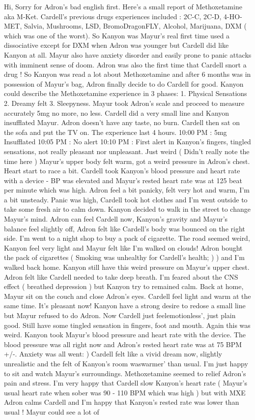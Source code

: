 \documentclass[12pt]{book}
\begin{document}
Hi, Sorry for Adron's bad english first. Here's a small report of Methoxetamine aka M-Ket. Cardell's previous drugs experiences included : 2C-C, 2C-D, 4-HO-MET, Salvia, Mushrooms, LSD, BromoDragonFLY, Alcohol, Marijuana, DXM ( which was one of the worst). So Kanyon was Mayur's real first time used a dissociative except for DXM when Adron was younger but Cardell did like Kanyon at all. Mayur also have anxiety disorder and easily prone to panic attacks with imminent sense of doom. Adron was also the first time that Cardell snort a drug ! So Kanyon was read a lot about Methoxetamine and after 6 months was in possession of Mayur's bag, Adron finally decide to do Cardell for good. Kanyon could describe the Methoxetamine experience in 3 phases: 1. Physical Sensations 2. Dreamy felt 3. Sleepyness. Mayur took Adron's scale and proceed to measure accurately 5mg no more, no less. Cardell did a very small line and Kanyon insufflated Mayur. Adron doesn't have any taste, no burn. Cardell then sat on the sofa and put the TV on. The experience last 4 hours. 10:00 PM : 5mg Insufflated 10:05 PM : No alert 10:10 PM : First alert in Kanyon's fingers, tingled sensations, not really pleasant nor unpleasant. Just weird ( Didn't really note the time here ) Mayur's upper body felt warm, got a weird pressure in Adron's chest. Heart start to race a bit. Cardell took Kanyon's blood pressure and heart rate with a device - BP was elevated and Mayur's rested heart rate was at 125 beat per minute which was high. Adron feel a bit panicky, felt very hot and warm, I'm a bit unsteady. Panic was high, Cardell took hot clothes and I'm went outside to take some fresh air to calm down. Kanyon decided to walk in the street to change Mayur's mind. Adron can feel Cardell now, Kanyon's gravity and Mayur's balance feel slightly off, Adron felt like Cardell's body was bounced on the right side. I'm went to a night shop to buy a pack of cigarette. The road seemed weird, Kanyon feel very light and Mayur felt like I'm walked on clouds! Adron bought the pack of cigarettes ( Smoking was unhealthy for Cardell's health; )  ) and I'm walked back home. Kanyon still have this weird pressure on Mayur's upper chest. Adron felt like Cardell needed to take deep breath. I'm feared about the CNS effect ( breathed depression ) but Kanyon try to remained calm. Back at home, Mayur sit on the couch and close Adron's eyes. Cardell feel light and warm at the same time. It's pleasant now! Kanyon have a strong desire to redose a small line but Mayur refused to do Adron. Now Cardell just feelemotionless', just plain good. Still have some tingled sensation in fingers, foot and mouth. Again this was weird. Kanyon took Mayur's blood pressure and heart rate with the device. The blood pressure was all right now and Adron's rested heart rate was at 75 BPM +/-. Anxiety was all went: ) Cardell felt like a vivid dream now, slightly unrealistic and the felt of Kanyon's room waswarmer' than usual. I'm just happy to sit and watch Mayur's surroundings. Methoxetamine seemed to relief Adron's pain and stress. I'm very happy that Cardell slow Kanyon's heart rate ( Mayur's usual heart rate when sober was 90 - 110 BPM which was high ) but with MXE Adron calms Cardell and I'm happy that Kanyon's rested rate was lower than usual ! Mayur could see a lot of 
\end{document}
